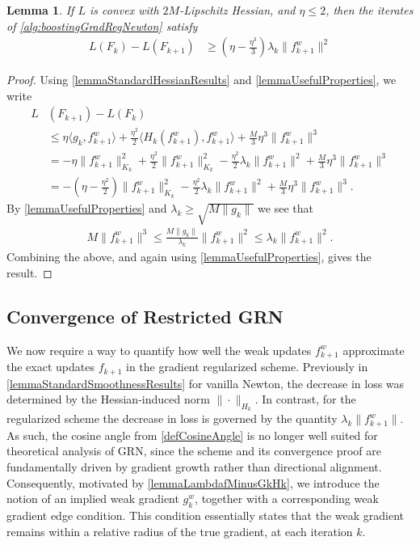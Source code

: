 \documentclass{article}
\theoremstyle{plain}
\newtheorem{lemma}[theorem]{Lemma}
\theoremstyle{definition}
\theoremstyle{remark}
\begin{document}
\begin{lemma}\label{lemmaDecreaseInLossNEW}
If $L$ is convex with $2M$-Lipschitz Hessian, and $\eta\leq 2$, then the iterates of \cref{alg:boostingGradRegNewton} satisfy 
\begin{align}
    L(F_k) - L(F_{k+1}) 
    &\geq \left( \eta - \frac{\eta^3}{3} \right) \lambda_k \|f^w_{k+1}\|^2
\end{align}
\end{lemma}
\begin{proof}
    Using \cref{lemmaStandardHessianResults} and \cref{lemmaUsefulProperties}, we write
    \begin{align*}
        L&(F_{k+1}) - L(F_k) \\
        &\leq  \eta \langle  g_k,  f_{k+1}^w\rangle + \frac{\eta^2}{2}\langle H_k(f_{k+1}^w),  f_{k+1}^w\rangle + \frac{M}{3} \eta^3\|f_{k+1}^w\|^3 \\
        &= -\eta \|f_{k+1}^w\|_{K_k}^2 + \frac{\eta^2}{2}\|f_{k+1}^w\|_{K_k}^2 - \frac{\eta^2}{2}\lambda_k\|f_{k+1}^w\|^2 + \frac{M}{3}\eta^3 \|f_{k+1}^w\|^3 \\
        &= -\left( \eta - \frac{\eta^2}{2} \right) \|f_{k+1}^w\|_{K_k}^2 - \frac{\eta^2}{2}\lambda_k\|f_{k+1}^w\|^2 +  \frac{M}{3}\eta^3 \|f_{k+1}^w\|^3.
    \end{align*}
    By \cref{lemmaUsefulProperties} and $\lambda_k \geq \sqrt{M \|g_k\|}$ we see that
    \begin{align*}
        M \|f_{k+1}^w\|^3
        \leq \frac{M \|g_k\|}{\lambda_k}\|f_{k+1}^w\|^2
        \leq \lambda_k\|f_{k+1}^w\|^2.
    \end{align*}
    Combining the above, and again using \cref{lemmaUsefulProperties}, gives the result.
\end{proof}


\subsection{Convergence of Restricted GRN}

We now require a way to quantify how well the weak updates $f^w_{k+1}$ approximate the exact updates $f_{k+1}$ in the gradient regularized scheme. Previously in \cref{lemmaStandardSmoothnessResults} for vanilla Newton, the decrease in loss was determined by the Hessian-induced norm $\|\cdot\|_{H_k}$. In contrast, for the regularized scheme the decrease in loss is governed by the quantity $\lambda_k \|f^w_{k+1}\|$. As such, the cosine angle from \cref{defCosineAngle} is no longer well suited for theoretical analysis of GRN, since the scheme and its convergence proof are fundamentally driven by gradient growth rather than directional alignment. Consequently, motivated by \cref{lemmaLambdafMinusGkHk}, we introduce the notion of an implied weak gradient $g^w_k$, together with a corresponding weak gradient edge condition. This condition essentially states that the weak gradient remains within a relative radius of the true gradient, at each iteration $k$.
\end{document}
